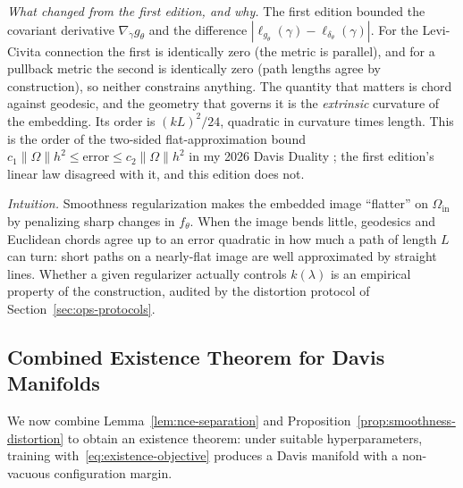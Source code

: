 \documentclass[11pt]{article}
\theoremstyle{remark}
\theoremstyle{plain}
\begin{document}
\noindent\emph{What changed from the first edition, and why.}
The first edition bounded the covariant derivative $\nabla_{\dot\gamma} g_\theta$ and the difference
$|\ell_{g_\theta}(\gamma) - \ell_{\delta_\theta}(\gamma)|$. For the Levi-Civita connection the first is
identically zero (the metric is parallel), and for a pullback metric the second is identically zero (path
lengths agree by construction), so neither constrains anything. The quantity that matters is chord against
geodesic, and the geometry that governs it is the \emph{extrinsic} curvature of the embedding. Its order is
$(kL)^2/24$, quadratic in curvature times length. This is the order of the two-sided flat-approximation
bound $c_1\|\Omega\|h^2 \le \text{error} \le c_2\|\Omega\|h^2$ in my 2026 Davis Duality
\cite{davis2026duality}; the first edition's linear law disagreed with it, and this edition does not.

\noindent\emph{Intuition.}
Smoothness regularization makes the embedded image ``flatter'' on $\Omega_{\mathrm{in}}$ by penalizing sharp
changes in $f_\theta$. When the image bends little, geodesics and Euclidean chords agree up to an error
quadratic in how much a path of length $L$ can turn: short paths on a nearly-flat image are well approximated
by straight lines. Whether a given regularizer actually controls $k(\lambda)$ is an empirical property of the
construction, audited by the distortion protocol of Section~\ref{sec:ops-protocols}.

\subsection{Combined Existence Theorem for Davis Manifolds}
\label{subsec:existence-main}

We now combine Lemma~\ref{lem:nce-separation} and
Proposition~\ref{prop:smoothness-distortion} to obtain an existence theorem: under suitable
hyperparameters, training with~\eqref{eq:existence-objective} produces a Davis manifold with a
non-vacuous configuration margin.
\end{document}
